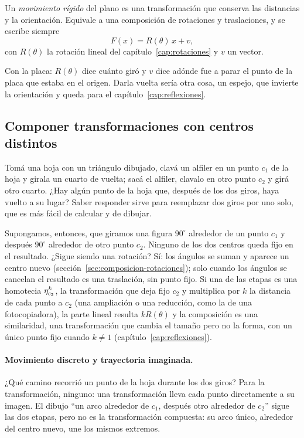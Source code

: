 \begin{definicion}\label{def:movimiento-rigido}
Un \emph{movimiento rígido} del plano es una transformación que conserva las distancias y la
orientación. Equivale a una composición de rotaciones y traslaciones, y se escribe siempre
\[
F(x)=R(\theta)\,x+v,
\]
con \(R(\theta)\) la rotación lineal del capítulo~\ref{cap:rotaciones} y \(v\) un vector.
\end{definicion}

Con la placa: \(R(\theta)\) dice cuánto giró y \(v\) dice adónde fue a parar el punto de la
placa que estaba en el origen. Darla vuelta sería otra cosa, un espejo, que invierte la
orientación y queda para el capítulo~\ref{cap:reflexiones}.

\subsection{Componer transformaciones con centros distintos}\label{sec:componer-centros}

Tomá una hoja con un triángulo dibujado, clavá un alfiler en un punto \(c_1\) de la hoja y
girala un cuarto de vuelta; sacá el alfiler, clavalo en otro punto \(c_2\) y girá otro cuarto.
¿Hay algún punto de la hoja que, después de los dos giros, haya vuelto a su lugar? Saber
responder sirve para reemplazar dos giros por uno solo, que es más fácil de calcular y de
dibujar.

Supongamos, entonces, que giramos una figura \(90^\circ\) alrededor de un punto \(c_1\) y después
\(90^\circ\) alrededor de otro punto \(c_2\). Ninguno de los dos centros queda fijo en el
resultado. ¿Sigue siendo una rotación? Sí: los
ángulos se suman y aparece un centro nuevo (sección~\ref{sec:composicion-rotaciones}); solo
cuando los ángulos se cancelan el resultado es una traslación, sin punto fijo. Si una de las
etapas es una homotecia \(\eta_{c_2}^{k}\), la transformación que deja fijo \(c_2\) y multiplica
por \(k\) la distancia de cada punto a \(c_2\) (una ampliación o una reducción, como la de una
fotocopiadora), la parte lineal resulta \(kR(\theta)\) y la
composición es una similaridad, una transformación que cambia el tamaño pero no la forma, con
un único punto fijo cuando \(k\neq1\)
(capítulo~\ref{cap:reflexiones}).

\paragraph{Movimiento discreto y trayectoria imaginada.}
¿Qué camino recorrió un punto de la hoja durante los dos giros? Para la transformación, ninguno:
una transformación lleva cada punto directamente a su imagen. El dibujo \enquote{un arco
alrededor de \(c_1\), después otro alrededor de \(c_2\)} sigue las dos etapas, pero no es la
transformación compuesta: su arco único, alrededor del centro nuevo, une los mismos extremos.

